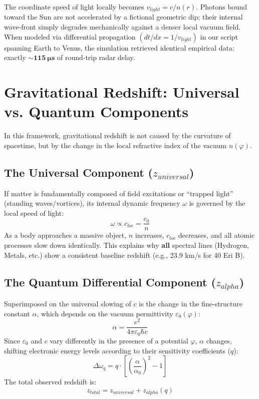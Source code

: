 \documentclass[reprint,amsmath,amssymb,aps,prd,twocolumn]{revtex4-2}
\begin{document}
The coordinate speed of light locally becomes $v_{light} = c / n(r)$. Photons bound toward the Sun are not accelerated by a fictional geometric dip; their internal wave-front simply degrades mechanically against a denser local vacuum field.
When modeled via differential propagation $(dt/dx = 1/v_{light})$ in our script spanning Earth to Venus, the simulation retrieved identical empirical data: exactly $\mathbf{\sim 115\ \mu s}$ of round-trip radar delay.

\section{Gravitational Redshift: Universal vs. Quantum Components}

In this framework, gravitational redshift is not caused by the curvature of spacetime, but by the change in the local refractive index of the vacuum $n(\varphi)$.

\subsection{The Universal Component ($z_{universal}$)}
If matter is fundamentally composed of field excitations or ``trapped light'' (standing waves/vortices), its internal dynamic frequency $\omega$ is governed by the local speed of light:
\begin{equation}
\omega \propto c_{loc} = \frac{c_0}{n}
\end{equation}
As a body approaches a massive object, $n$ increases, $c_{loc}$ decreases, and all atomic processes slow down identically. This explains why \textbf{all} spectral lines (Hydrogen, Metals, etc.) show a consistent baseline redshift (e.g., 23.9 km/s for 40 Eri B).

\subsection{The Quantum Differential Component ($z_{alpha}$)}
Superimposed on the universal slowing of $c$ is the change in the fine-structure constant $\alpha$, which depends on the vacuum permittivity $\varepsilon_0(\varphi)$:
\begin{equation}
\alpha = \frac{e^2}{4\pi \varepsilon_0 \hbar c}
\end{equation}
Since $\varepsilon_0$ and $c$ vary differently in the presence of a potential $\varphi$, $\alpha$ changes, shifting electronic energy levels according to their sensitivity coefficients ($q$):
\begin{equation}
\Delta \omega_{q} = q \cdot \left[ \left( \frac{\alpha}{\alpha_0} \right)^2 - 1 \right]
\end{equation}
The total observed redshift is:
\begin{equation}
z_{total} = z_{universal} + z_{alpha}(q)
\end{equation}
\end{document}
